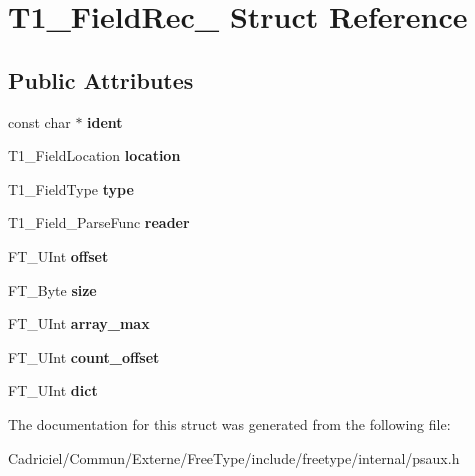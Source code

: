 \hypertarget{struct_t1___field_rec__}{\section{T1\-\_\-\-Field\-Rec\-\_\- Struct Reference}
\label{struct_t1___field_rec__}
}
\subsection*{Public Attributes}
\begin{DoxyCompactItemize}
\item 
\hypertarget{struct_t1___field_rec___aaf70ae870eff9ea2b0518ef5e7301cfd}{const char $\ast$ {\bfseries ident}}\label{struct_t1___field_rec___aaf70ae870eff9ea2b0518ef5e7301cfd}

\item 
\hypertarget{struct_t1___field_rec___a1e17111c68df523f82d20bddd822ca4d}{T1\-\_\-\-Field\-Location {\bfseries location}}\label{struct_t1___field_rec___a1e17111c68df523f82d20bddd822ca4d}

\item 
\hypertarget{struct_t1___field_rec___ad873155b36b72db9a1feaf2699fed1ce}{T1\-\_\-\-Field\-Type {\bfseries type}}\label{struct_t1___field_rec___ad873155b36b72db9a1feaf2699fed1ce}

\item 
\hypertarget{struct_t1___field_rec___a95e227de47c22bdadd77f797ff43d89d}{T1\-\_\-\-Field\-\_\-\-Parse\-Func {\bfseries reader}}\label{struct_t1___field_rec___a95e227de47c22bdadd77f797ff43d89d}

\item 
\hypertarget{struct_t1___field_rec___a41b503016f68291e061a2e29498982c1}{F\-T\-\_\-\-U\-Int {\bfseries offset}}\label{struct_t1___field_rec___a41b503016f68291e061a2e29498982c1}

\item 
\hypertarget{struct_t1___field_rec___a8ce74a7ad2276abe8942883e7fbb1241}{F\-T\-\_\-\-Byte {\bfseries size}}\label{struct_t1___field_rec___a8ce74a7ad2276abe8942883e7fbb1241}

\item 
\hypertarget{struct_t1___field_rec___a87f063bd3ad0dcfa30c00946d9f9cae8}{F\-T\-\_\-\-U\-Int {\bfseries array\-\_\-max}}\label{struct_t1___field_rec___a87f063bd3ad0dcfa30c00946d9f9cae8}

\item 
\hypertarget{struct_t1___field_rec___a41d8814cc651d0276f8cfad751721326}{F\-T\-\_\-\-U\-Int {\bfseries count\-\_\-offset}}\label{struct_t1___field_rec___a41d8814cc651d0276f8cfad751721326}

\item 
\hypertarget{struct_t1___field_rec___a509f7ddb1e0ffe050017daa29223e224}{F\-T\-\_\-\-U\-Int {\bfseries dict}}\label{struct_t1___field_rec___a509f7ddb1e0ffe050017daa29223e224}

\end{DoxyCompactItemize}


The documentation for this struct was generated from the following file\-:\begin{DoxyCompactItemize}
\item 
Cadriciel/\-Commun/\-Externe/\-Free\-Type/include/freetype/internal/psaux.\-h\end{DoxyCompactItemize}
